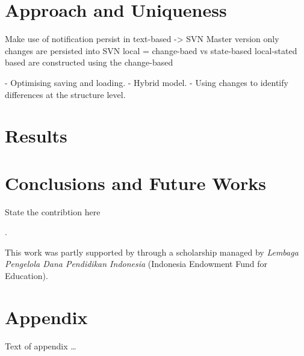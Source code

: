 \documentclass[sigplan,review,anonymous]{acmart}\settopmatter{printfolios=true,printccs=false,printacmref=false}
\begin{document}
\section{Approach and Uniqueness}

Make use of notification
persist in text-based -> SVN
Master version
only changes are persisted into SVN
local = change-baed vs state-based
local-stated based are constructed using the change-based

- Optimising saving and loading.
- Hybrid model.
- Using changes to identify differences at the structure level.


\section{Results}

\section{Conclusions and Future Works}
State the contribtion here

\cite{DBLP:conf/ecmdafa/RathHV12}.



\begin{acks}                            %
This work was partly supported by through a scholarship managed by \emph{Lembaga Pengelola Dana Pendidikan Indonesia} (Indonesia Endowment Fund for Education).
\end{acks}





\appendix
\section{Appendix}

Text of appendix \ldots
\end{document}
